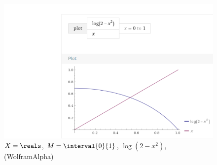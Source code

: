 \begin{beispiel*}
    \begin{figure}[H]
        \centering
        \includegraphics[width=0.5\linewidth]{figures/fixpunkt_beispiel}
        \caption*{\( X=\reals \), \( M=\interval{0}{1} \), \( \log(2-x^2)\), (WolframAlpha)}
        \label{fig:fixpunkt_beispiel}
    \end{figure}
\end{beispiel*}
